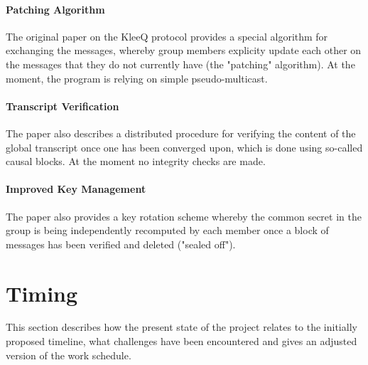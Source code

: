 \documentclass[12pt, a4paper]{article}
\begin{document}
\paragraph{Patching Algorithm}
The original paper on the KleeQ protocol \cite{kleeq} provides a special algorithm for exchanging the messages, whereby group members explicity update each other on the messages that they do not currently have (the "patching" algorithm). At the moment, the program is relying on simple pseudo-multicast.

\paragraph{Transcript Verification}
The paper \cite{kleeq} also describes a distributed procedure for verifying the content of the global transcript once one has been converged upon, which is done using so-called causal blocks. At the moment no integrity checks are made.

\paragraph{Improved Key Management}
The paper \cite{kleeq} also provides a key rotation scheme whereby the common secret in the group is being independently recomputed by each member once a block of messages has been verified and deleted ("sealed off").


\section{Timing}
This section describes how the present state of the project relates to the initially proposed timeline, what challenges have been encountered and gives an adjusted version of the work schedule.
\end{document}
